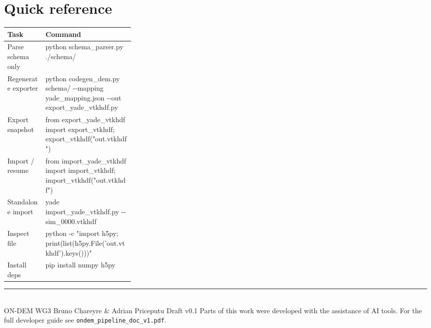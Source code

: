 \documentclass[10pt,a4paper]{article}
\begin{document}
\section{Quick reference}

\begin{tabularx}{\textwidth}{>{\small}p{0.30\linewidth}>{\ttfamily\footnotesize\raggedright\arraybackslash}X}
\toprule
\sffamily\textbf{Task} & \sffamily\textbf{Command} \\
\midrule
Parse schema only &
  python schema\_parser.py ./schema/ \\
Regenerate exporter &
  python codegen\_dem.py schema/ -{}-mapping yade\_mapping.json -{}-out export\_yade\_vtkhdf.py \\
Export snapshot &
  from export\_yade\_vtkhdf import export\_vtkhdf; export\_vtkhdf("out.vtkhdf") \\
Import / resume &
  from import\_yade\_vtkhdf import import\_vtkhdf; import\_vtkhdf("out.vtkhdf") \\
Standalone import &
  yade import\_yade\_vtkhdf.py -{}- sim\_0000.vtkhdf \\
Inspect file &
  python -c "import h5py; print(list(h5py.File('out.vtkhdf').keys()))" \\
Install deps &
  pip install numpy h5py \\
\bottomrule
\end{tabularx}

\vfill
{\color{RuleLine}\rule{\linewidth}{0.4pt}}\\[2pt]
{\footnotesize\sffamily\color{GrayMid}
ON-DEM WG3 \textbullet\;
Bruno Chareyre \& Adrian Priceputu \textbullet\;
Draft v0.1 \textbullet\;
Parts of this work were developed with the assistance of AI tools.
For the full developer guide see \texttt{ondem\_pipeline\_doc\_v1.pdf}.}
\end{document}
